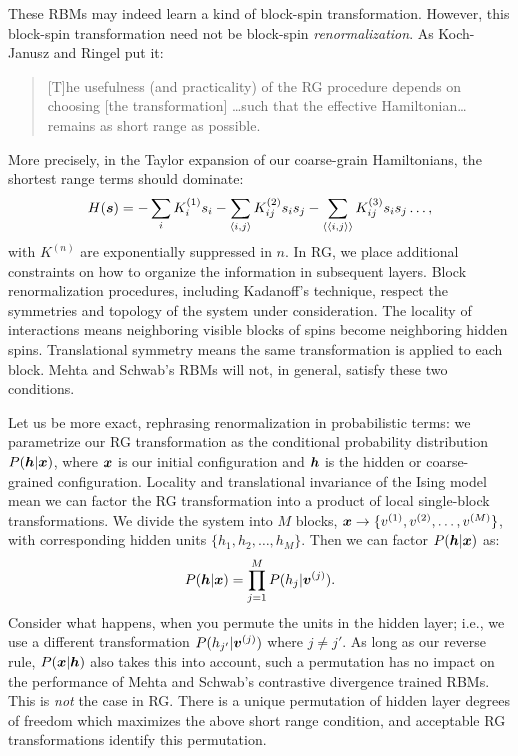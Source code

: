 These RBMs may indeed learn a kind of block-spin
transformation. However, this block-spin transformation need not be
block-spin \textit{renormalization}. As Koch-Janusz and Ringel put it:
\begin{quote}
  [T]he usefulness (and practicality) of the RG procedure depends on
  choosing [the transformation] \ldots such that the effective
  Hamiltonian\ldots remains as short range as possible.~\cite{kjr}
\end{quote}
More precisely, in the Taylor expansion of our coarse-grain
Hamiltonians, the shortest range terms should dominate:
\begin{equation}%
  H(\bs)=-\sum_i K^{(1)}_{i} s_i - \sum_{\expect{i,j}}K^{(2)}_{ij}s_i s_j-\sum_{\expect{\expect{i,j}}}K^{(3)}_{ij}s_i s_j\ldots,
\end{equation}%
with $K^{(n)}$ are exponentially suppressed in $n$. In RG, we place
additional constraints on how to organize the information in
subsequent layers. Block renormalization procedures, including
Kadanoff's technique, respect the symmetries and topology of the
system under consideration. The locality of interactions means
neighboring visible blocks of spins become neighboring hidden
spins. Translational symmetry means the same transformation is applied
to each block.  Mehta and Schwab's RBMs will not, in general, satisfy
these two conditions.

Let us be more exact, rephrasing renormalization in probabilistic
terms: we parametrize our RG transformation as the conditional
probability distribution $P(\boldsymbol{h}\rvert\boldsymbol{x})$, where $\boldsymbol{x}$ is our initial
configuration and $\boldsymbol{h}$ is the hidden or coarse-grained
configuration. Locality and translational invariance of the Ising
model mean we can factor the RG transformation into a product of local
single-block transformations. We divide the system into $M$ blocks,
$\boldsymbol{x}\rightarrow\{v^{(1)}, v^{(2)},\ldots, v^{(M)}\}$, with
corresponding hidden units $\{h_1, h_2,\ldots,h_M\}$. Then we can
factor $P(\boldsymbol{h}\rvert \boldsymbol{x})$ as:
\begin{equation}%
  P(\bh\rvert\bx)=\prod_{j=1}^M P(h_j\rvert \bv^{(j)}).\label{eq:prob-block-rg}
\end{equation}%
Consider what happens, when you permute the units in the hidden layer;
i.e., we use a different transformation $P(h_{j'}\rvert \boldsymbol{v}^{(j)})$
where $j\neq j'$.  As long as our reverse rule, $P(\boldsymbol{x}\rvert\boldsymbol{h})$ also
takes this into account, such a permutation has no impact on the
performance of Mehta and Schwab's contrastive divergence trained
RBMs. This is \textit{not} the case in RG\@. There is a unique
permutation of hidden layer degrees of freedom which maximizes the
above short range condition, and acceptable RG transformations
identify this permutation.


